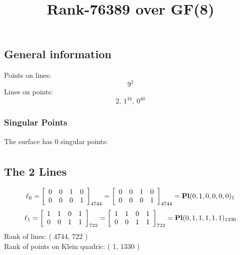 \documentclass{article}
\newcommand\setTBstruts{\def\T{\rule{0pt}{2.6ex}}%
\def\B{\rule[-1.2ex]{0pt}{0pt}}}
\begin{document}
 
\setTBstruts



{\allowdisplaybreaks%






\title{Rank-76389 over GF(8)}
\author{}%
\maketitle%
%
{}



\subsection*{General information}
Points on lines:
$$
9^2$$
Lines on points:
$$
2,\,1^{16},\,0^{40}$$
\subsubsection*{Singular Points}
The surface has 0 singular points:\\
\begin{align*}
\end{align*}
\subsection*{The 2 Lines}
$$
\ell_{0} = 
\left[
\begin{array}{*{4}{r}}
0 & 0 & 1 & 0\\
0 & 0 & 0 & 1\\
\end{array}
\right]
_{4744}
=
\left[
\begin{array}{*{4}c}
0  & 0  & 1  & 0\\
0  & 0  & 0  & 1\\
\end{array}
\right]_{4744}
={\rm\bf Pl}(0,1,0,0,0,0 )_{1}$$
$$
\ell_{1} = 
\left[
\begin{array}{*{4}{r}}
1 & 1 & 0 & 1\\
0 & 0 & 1 & 1\\
\end{array}
\right]
_{722}
=
\left[
\begin{array}{*{4}c}
1  & 1  & 0  & 1\\
0  & 0  & 1  & 1\\
\end{array}
\right]_{722}
={\rm\bf Pl}(0,1,1,1,1,1 )_{1330}$$
Rank of lines: ( 4744, 722 )\\
Rank of points on Klein quadric: ( 1, 1330 )\\
}
\end{document}
